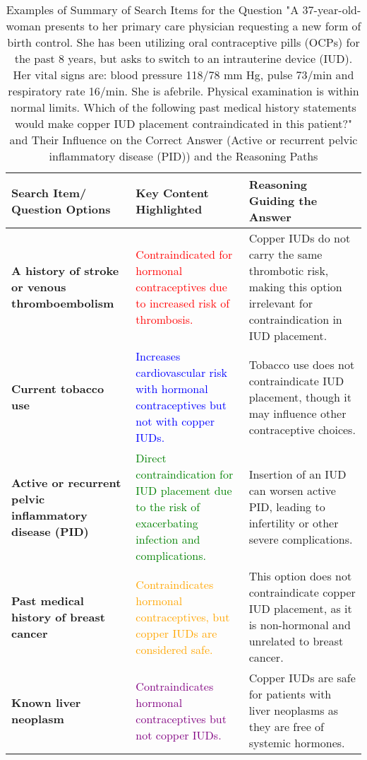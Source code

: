 \begin{table*}[h!]
\centering
\begin{tabular}{|p{3cm}|p{4cm}|p{4cm}|}
\hline
\textbf{Search Item/ Question Options} & \textbf{Key Content Highlighted} & \textbf{Reasoning Guiding the Answer} \\ \hline

\textbf{A history of stroke or venous thromboembolism} &
\textcolor{red}{Contraindicated for hormonal contraceptives due to increased risk of thrombosis.} &
Copper IUDs do not carry the same thrombotic risk, making this option irrelevant for contraindication in IUD placement. \\ \hline

\textbf{Current tobacco use} &
\textcolor{blue}{Increases cardiovascular risk with hormonal contraceptives but not with copper IUDs.} &
Tobacco use does not contraindicate IUD placement, though it may influence other contraceptive choices. \\ \hline

\textbf{Active or recurrent pelvic inflammatory disease (PID)} &
\textcolor{green}{Direct contraindication for IUD placement due to the risk of exacerbating infection and complications.} &
Insertion of an IUD can worsen active PID, leading to infertility or other severe complications. \\ \hline

\textbf{Past medical history of breast cancer} &
\textcolor{orange}{Contraindicates hormonal contraceptives, but copper IUDs are considered safe.} &
This option does not contraindicate copper IUD placement, as it is non-hormonal and unrelated to breast cancer. \\ \hline

\textbf{Known liver neoplasm} &
\textcolor{purple}{Contraindicates hormonal contraceptives but not copper IUDs.} &
Copper IUDs are safe for patients with liver neoplasms as they are free of systemic hormones. \\ \hline

\end{tabular}
\caption{Examples of Summary of Search Items for the Question "A 37-year-old-woman presents to her primary care physician requesting a new form of birth control. She has been utilizing oral contraceptive pills (OCPs) for the past 8 years, but asks to switch to an intrauterine device (IUD). Her vital signs are: blood pressure 118/78 mm Hg, pulse 73/min and respiratory rate 16/min. She is afebrile. Physical examination is within normal limits. Which of the following past medical history statements would make copper IUD placement contraindicated in this patient?" and Their Influence on the Correct Answer (Active or recurrent pelvic inflammatory disease (PID)) and the Reasoning Paths}
\label{table:search_guidance_2}
\end{table*}



